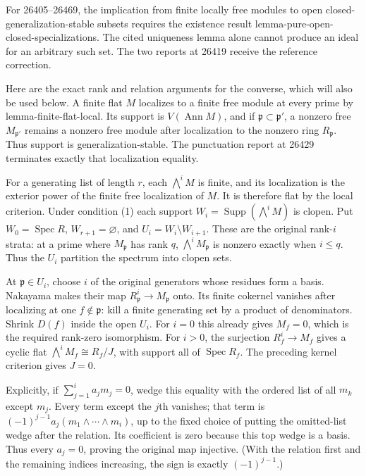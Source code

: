 For 26405--26469, the implication from finite locally free modules to open closed-generalization-stable subsets requires the existence result lemma-pure-open-closed-specializations. The cited uniqueness lemma alone cannot produce an ideal for an arbitrary such set. The two reports at 26419 receive the reference correction.

Here are the exact rank and relation arguments for the converse, which will also be used below. A finite flat \(M\) localizes to a finite free module at every prime by lemma-finite-flat-local. Its support is \(V(\operatorname{Ann}M)\), and if \(\mathfrak p\subset\mathfrak p'\), a nonzero free \(M_{\mathfrak p'}\) remains a nonzero free module after localization to the nonzero ring \(R_{\mathfrak p}\). Thus support is generalization-stable. The punctuation report at 26429 terminates exactly that localization equality.

For a generating list of length \(r\), each \(\bigwedge^i M\) is finite, and its localization is the exterior power of the finite free localization of \(M\). It is therefore flat by the local criterion. Under condition (1) each support \(W_i=\operatorname{Supp}(\bigwedge^iM)\) is clopen. Put \(W_0=\operatorname{Spec}R\), \(W_{r+1}=\varnothing\), and \(U_i=W_i\setminus W_{i+1}\). These are the original rank-\(i\) strata: at a prime where \(M_{\mathfrak p}\) has rank \(q\), \(\bigwedge^i M_{\mathfrak p}\) is nonzero exactly when \(i\le q\). Thus the \(U_i\) partition the spectrum into clopen sets.

At \(\mathfrak p\in U_i\), choose \(i\) of the original generators whose residues form a basis. Nakayama makes their map \(R_{\mathfrak p}^i\to M_{\mathfrak p}\) onto. Its finite cokernel vanishes after localizing at one \(f\notin\mathfrak p\): kill a finite generating set by a product of denominators. Shrink \(D(f)\) inside the open \(U_i\). For \(i=0\) this already gives \(M_f=0\), which is the required rank-zero isomorphism. For \(i>0\), the surjection \(R_f^i\to M_f\) gives a cyclic flat \(\bigwedge^iM_f\cong R_f/J\), with support all of \(\operatorname{Spec}R_f\). The preceding kernel criterion gives \(J=0\).

Explicitly, if \(\sum_{j=1}^i a_jm_j=0\), wedge this equality with the ordered list of all \(m_k\) except \(m_j\). Every term except the \(j\)th vanishes; that term is \((-1)^{j-1}a_j(m_1\wedge\cdots\wedge m_i)\), up to the fixed choice of putting the omitted-list wedge after the relation. Its coefficient is zero because this top wedge is a basis. Thus every \(a_j=0\), proving the original map injective. (With the relation first and the remaining indices increasing, the sign is exactly \((-1)^{j-1}\).)

